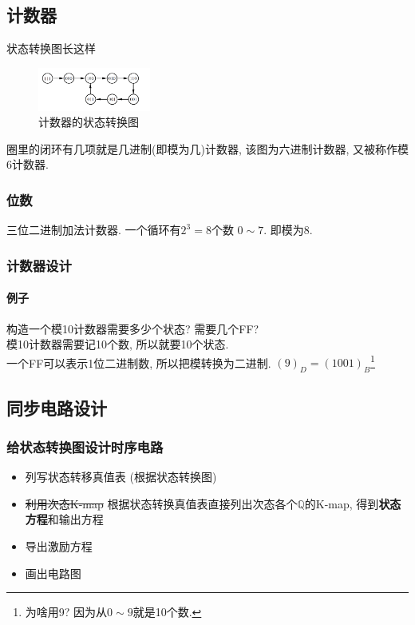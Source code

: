 \documentclass[scheme=chinese,a4paper]{report}
\begin{document}
\subsection{计数器}
状态转换图长这样
\begin{figure}[H]
\centering
\includegraphics[width=0.33\textwidth]{counter_graph.png}
\caption{计数器的状态转换图}
\end{figure}
圈里的闭环有几项就是几进制(即模为几)计数器, 该图为六进制计数器, 又被称作模6计数器. 
\subsubsection{位数}
三位二进制加法计数器. 一个循环有$2^3=8$个数 $0\sim 7$. 即模为8. 
\subsubsection{计数器设计}
\paragraph{例子} 构造一个模10计数器需要多少个状态? 需要几个FF? \\
模10计数器需要记10个数, 所以就要10个状态. \\
一个FF可以表示1位二进制数, 所以把模转换为二进制. $(9)_D=(1001)_B$\footnote{为啥用9? 因为从$0\sim 9$就是10个数. }

\subsection{同步电路设计}

\subsubsection{给状态转换图设计时序电路}
\begin{itemize}
    \item 列写状态转移真值表 (根据状态转换图)
    \item \sout{利用次态K-map} 根据状态转换真值表直接列出次态各个$\mathbb{Q}$的K-map, 得到\textbf{状态方程}和输出方程
    \item 导出激励方程
    \item 画出电路图
\end{itemize}
\end{document}
